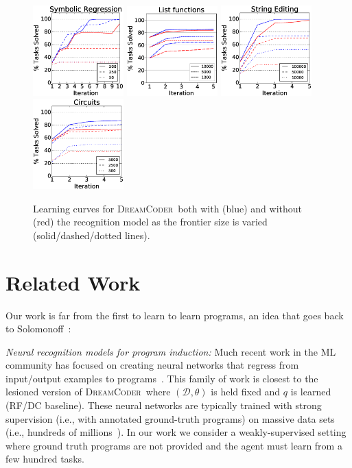 \documentclass{article}
\newcommand{\system}{\textsc{DreamCoder}~}
\begin{document}
\begin{figure}\centering
\includegraphics[width = 3.5cm]{figures/regression.eps} 
  \includegraphics[width = 3.5cm]{figures/list.eps}
  \includegraphics[width = 3.5cm]{figures/textLearningCurve.eps}        
  \includegraphics[width = 3.5cm]{figures/circuitLearningCurve.eps}  
  \caption{Learning curves for \system both with (blue) and without (red) the recognition model as the frontier size is varied (solid/dashed/dotted lines).}\label{learningCurves} 
\end{figure}

 \section{Related Work}
 Our work is far from the first to learn to learn programs,
 an  idea that goes back to Solomonoff~\cite{solomonoff1989system}:

 \noindent \emph{Neural recognition models for program induction:} Much recent work in the ML community has
 focused on creating neural networks that regress from
 input/output examples to programs~\cite{devlin2017robustfill,devlin2017neural,menon2013machine,balog2016deepcoder}. This family of work is closest to the lesioned version of
 \system where $(\mathcal{D},\theta)$ is held fixed and $q$ is learned (RF/DC baseline).
 These neural networks are typically trained with strong supervision (i.e., with annotated ground-truth programs) on massive data sets (i.e., hundreds of millions~\cite{devlin2017robustfill}).
 In our work we consider a weakly-supervised setting where ground truth programs are not provided and
 the agent must learn from a few hundred tasks.
 
\end{document}
